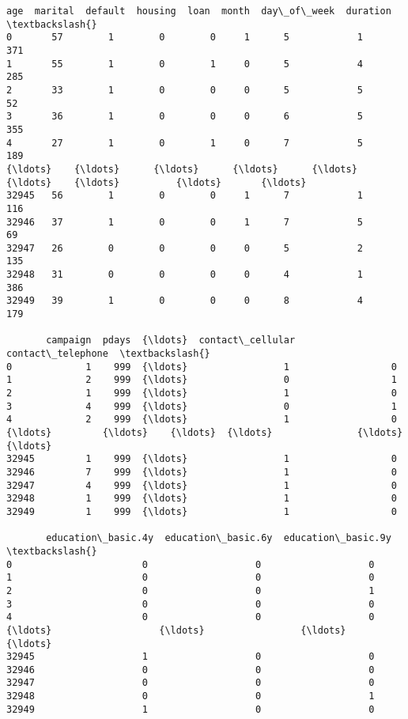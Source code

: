 \documentclass[11pt]{article}
\makeatletter
\newcommand{\boxspacing}{\kern\kvtcb@left@rule\kern\kvtcb@boxsep}
\newcommand{\prompt}[4]{
        {\ttfamily\llap{{\color{#2}[#3]:\hspace{3pt}#4}}\vspace{-\baselineskip}}
    }
\makeatother
\begin{document}
            \begin{tcolorbox}[breakable, size=fbox, boxrule=.5pt, pad at break*=1mm, opacityfill=0]
\prompt{Out}{outcolor}{42}{\boxspacing}
\begin{Verbatim}[commandchars=\\\{\}]
       age  marital  default  housing  loan  month  day\_of\_week  duration  \textbackslash{}
0       57        1        0        0     1      5            1       371
1       55        1        0        1     0      5            4       285
2       33        1        0        0     0      5            5        52
3       36        1        0        0     0      6            5       355
4       27        1        0        1     0      7            5       189
{\ldots}    {\ldots}      {\ldots}      {\ldots}      {\ldots}   {\ldots}    {\ldots}          {\ldots}       {\ldots}
32945   56        1        0        0     1      7            1       116
32946   37        1        0        0     1      7            5        69
32947   26        0        0        0     0      5            2       135
32948   31        0        0        0     0      4            1       386
32949   39        1        0        0     0      8            4       179

       campaign  pdays  {\ldots}  contact\_cellular  contact\_telephone  \textbackslash{}
0             1    999  {\ldots}                 1                  0
1             2    999  {\ldots}                 0                  1
2             1    999  {\ldots}                 1                  0
3             4    999  {\ldots}                 0                  1
4             2    999  {\ldots}                 1                  0
{\ldots}         {\ldots}    {\ldots}  {\ldots}               {\ldots}                {\ldots}
32945         1    999  {\ldots}                 1                  0
32946         7    999  {\ldots}                 1                  0
32947         4    999  {\ldots}                 1                  0
32948         1    999  {\ldots}                 1                  0
32949         1    999  {\ldots}                 1                  0

       education\_basic.4y  education\_basic.6y  education\_basic.9y  \textbackslash{}
0                       0                   0                   0
1                       0                   0                   0
2                       0                   0                   1
3                       0                   0                   0
4                       0                   0                   0
{\ldots}                   {\ldots}                 {\ldots}                 {\ldots}
32945                   1                   0                   0
32946                   0                   0                   0
32947                   0                   0                   0
32948                   0                   0                   1
32949                   1                   0                   0


\end{Verbatim}
\end{tcolorbox}
\end{document}
